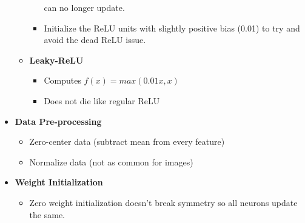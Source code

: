 \documentclass[12pt]{article}
\begin{document}
\begin{itemize}
\begin{itemize}
\begin{itemize}
        can no longer update.
        \item Initialize the ReLU units with slightly positive bias (0.01) to try and avoid
        the dead ReLU issue.
      \end{itemize}
      \item \textbf{Leaky-ReLU}
      \begin{itemize}
        \item Computes $f(x) = max(0.01x, x)$
        \item Does not die like regular ReLU
      \end{itemize}
    \end{itemize}
    \item \textbf{Data Pre-processing}
    \begin{itemize}
      \item Zero-center data (subtract mean from every feature)
      \item Normalize data (not as common for images)
    \end{itemize}
    \item \textbf{Weight Initialization}
    \begin{itemize}
      \item Zero weight initialization doesn't break symmetry so all neurons update the same.
      
    \end{itemize}
  \end{itemize}
\end{document}
